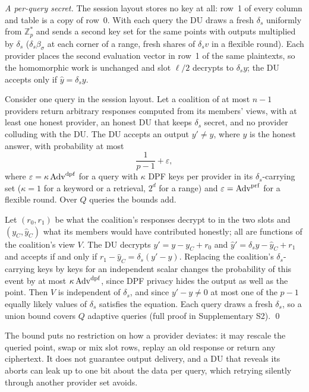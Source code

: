 \emph{A per-query secret.} The session layout stores no key at all: row~1 of
every column and table is a copy of row~0. With each query the DU draws a
fresh $\delta_s$ uniformly from $\mathbb{Z}_p^{*}$ and sends a second key set
for the same points with outputs multiplied by $\delta_s$
($\delta_s\beta_\sigma$ at each corner of a range, fresh shares of
$\delta_sv$ in a flexible round). Each provider places the second evaluation
vector in row~1 of the same plaintexts, so the homomorphic work is unchanged
and slot $\ell/2$ decrypts to $\delta_sy$; the DU accepts only if
$\hat y=\delta_sy$.

\begin{theorem}
\label{thm:tamper}
Consider one query in the session layout. Let a coalition of at most $n-1$
providers return arbitrary responses computed from its members' views, with at
least one honest provider, an honest DU that keeps $\delta_s$ secret, and no
provider colluding with the DU. The DU accepts an output $y'\neq y$, where $y$
is the honest answer, with probability at most
\[
\frac{1}{p-1}+\varepsilon ,
\]
where $\varepsilon=\kappa\,\mathrm{Adv}^{\mathrm{dpf}}$ for a query with $\kappa$ DPF keys per
provider in its $\delta_s$-carrying set ($\kappa=1$ for a keyword or a
retrieval, $2^d$ for a range) and $\varepsilon=\mathrm{Adv}^{\mathrm{prf}}$ for a flexible round.
Over $Q$ queries the bounds add.
\end{theorem}
\begin{pf}
Let $(r_0,r_1)$ be what the coalition's responses decrypt to in the two slots
and $(y_C,\hat y_C)$ what its members would have contributed honestly; all are
functions of the coalition's view $V$. The DU decrypts $y'=y-y_C+r_0$ and
$\hat y'=\delta_sy-\hat y_C+r_1$ and accepts if and only if
$r_1-\hat y_C=\delta_s(y'-y)$. Replacing the coalition's $\delta_s$-carrying
keys by keys for an independent scalar changes the probability of this event by
at most $\kappa\,\mathrm{Adv}^{\mathrm{dpf}}$, since DPF privacy hides the output as well as the
point. Then $V$ is independent of $\delta_s$, and since $y'-y\neq0$ at most one
of the $p-1$ equally likely values of $\delta_s$ satisfies the equation. Each
query draws a fresh $\delta_s$, so a union bound covers $Q$ adaptive queries
(full proof in Supplementary S2). \qed
\end{pf}
The bound puts no restriction on how a provider deviates: it may rescale the
queried point, swap or mix slot rows, replay an old response or return any
ciphertext. It does not guarantee output delivery, and a DU that reveals its
aborts can leak up to one bit about the data per query, which retrying silently
through another provider set avoids.

